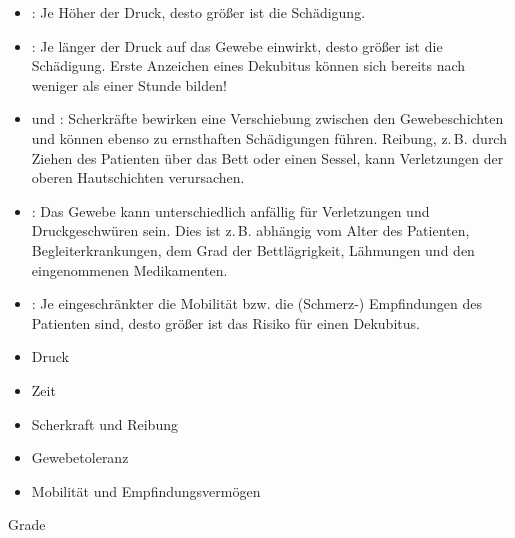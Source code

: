 \documentclass[
ngerman,
paper=a4,
asymmetric,
fontsize=10pt,
headings=small,
draft=false,
numbers=noenddot,
bibtotocnumbered,
footnotes=multiple,
toc=flat,
]{scrreprt}
\begin{document}
\begin{enumerate}
{{\begin{itemize}
  \item {}: Je Höher der Druck, desto größer ist die
  Schädigung.
  \item {}: Je länger der Druck auf das Gewebe
  einwirkt, desto größer ist die Schädigung. Erste
  Anzeichen eines Dekubitus können sich bereits nach
  weniger als einer Stunde bilden!
  \item {} und : Scherkräfte bewirken eine
  Verschiebung zwischen den Gewebeschichten und können
  ebenso zu ernsthaften Schädigungen führen. Reibung, z.\,B.
  durch Ziehen des Patienten über das Bett oder einen Sessel, kann Verletzungen der
  oberen Hautschichten verursachen.
  \item {}: Das Gewebe kann unterschiedlich
  anfällig für Verletzungen und Druckgeschwüren sein. Dies
  ist z.\,B. abhängig vom Alter des Patienten,
  Begleiterkrankungen, dem Grad der Bettlägrigkeit,
  Lähmungen und den eingenommenen Medikamenten.
  \item {}: Je
  eingeschränkter die Mobilität bzw. die (Schmerz-) Empfindungen des Patienten
  sind, desto größer ist das Risiko für einen Dekubitus.
\end{itemize}}
{\begin{itemize}
  \item {Druck}
  \item {Zeit}
  \item {Scherkraft} und {Reibung}
  \item {Gewebetoleranz}
  \item {Mobilität und Empfindungsvermögen}
\end{itemize}}
{}
{}
{}


\Text
{Grade}
{}}
\end{enumerate}
\end{document}
